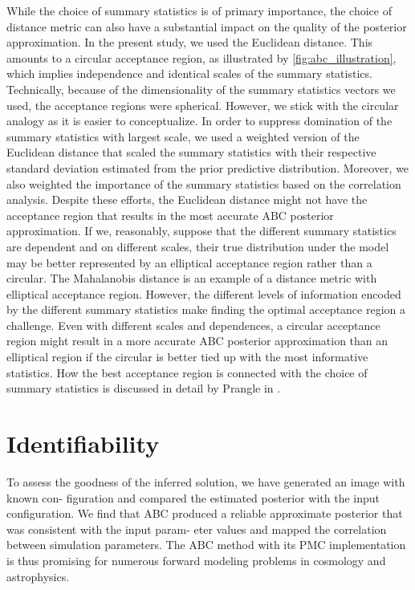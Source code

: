 While the choice of summary statistics is of primary importance, the choice of distance metric can also have a substantial impact on the quality of the posterior approximation. In the present study, we used the Euclidean distance. This amounts to a circular acceptance region, as illustrated by \autoref{fig:abc_illustration}, which implies independence and identical scales of the summary statistics. Technically, because of the dimensionality of the summary statistics vectors we used, the acceptance regions were spherical. However, we stick with the circular analogy as it is easier to conceptualize. In order to suppress domination of the summary statistics with largest scale, we used a weighted version of the Euclidean distance that scaled the summary statistics with their respective standard deviation estimated from the prior predictive distribution. Moreover, we also weighted the importance of the summary statistics based on the correlation analysis. Despite these efforts, the Euclidean distance might not have the acceptance region that results in the most accurate ABC posterior approximation. If we, reasonably, suppose that the different summary statistics are dependent and on different scales, their true distribution under the model may be better represented by an elliptical acceptance region rather than a circular. The Mahalanobis distance is an example of a distance metric with elliptical acceptance region. However, the different levels of information encoded by the different summary statistics make finding the optimal acceptance region a challenge. Even with different scales and dependences, a circular acceptance region might result in a more accurate ABC posterior approximation than an elliptical region if the circular is better tied up with the most informative statistics. How the best acceptance region is connected with the choice of summary statistics is discussed in detail by Prangle in \cite{prangle_distance}. 



\section{Identifiability}

To assess the goodness of the inferred solution, we have generated an image with known con- figuration and compared the estimated posterior with the input configuration. We find that ABC produced a reliable approximate posterior that was consistent with the input param- eter values and mapped the correlation between simulation parameters. The ABC method with its PMC implementation is thus promising for numerous forward modeling problems in cosmology and astrophysics.

